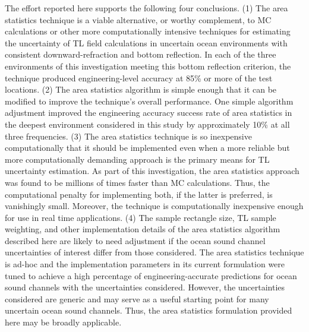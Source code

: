 The effort reported here supports the following four conclusions. (1)
The area statistics technique is a viable alternative, or worthy
complement, to \ac{MC} calculations or other more computationally
intensive techniques for estimating the uncertainty of \ac{TL} field
calculations in uncertain ocean environments with consistent
downward-refraction and bottom reflection. In each of the three
environments of this investigation meeting this bottom reflection
criterion, the technique produced engineering-level accuracy at 85\%
or more of the test locations. (2) The area statistics algorithm is
simple enough that it can be modified to improve the technique's
overall performance. One simple algorithm adjustment improved the
engineering accuracy success rate of area statistics in the deepest
environment considered in this study by approximately 10\% at all
three frequencies. (3) The area statistics technique is so inexpensive
computationally that it should be implemented even when a more
reliable but more computationally demanding approach is the primary
means for \ac{TL} uncertainty estimation. As part of this
investigation, the area statistics approach was found to be millions
of times faster than \ac{MC} calculations. Thus, the computational
penalty for implementing both, if the latter is preferred, is
vanishingly small. Moreover, the technique is computationally
inexpensive enough for use in real time applications. (4) The sample
rectangle size, \ac{TL} sample weighting, and other implementation
details of the area statistics algorithm described here are likely to
need adjustment if the ocean sound channel uncertainties of interest
differ from those considered. The area statistics technique is ad-hoc
and the implementation parameters in its current formulation were
tuned to achieve a high percentage of engineering-accurate predictions
for ocean sound channels with the uncertainties considered. However,
the uncertainties considered are generic and may serve as a useful
starting point for many uncertain ocean sound channels. Thus, the area
statistics formulation provided here may be broadly applicable.

